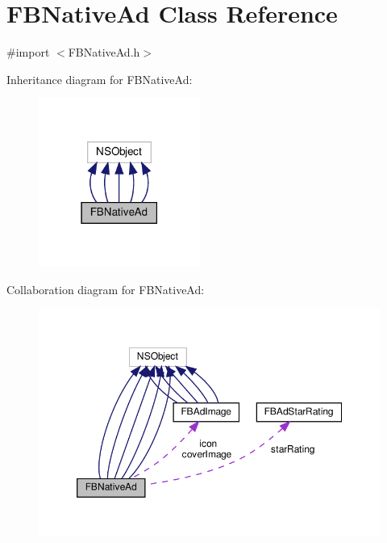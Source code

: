 \hypertarget{interfaceFBNativeAd}{}\section{F\+B\+Native\+Ad Class Reference}
\label{interfaceFBNativeAd}


{\ttfamily \#import $<$F\+B\+Native\+Ad.\+h$>$}



Inheritance diagram for F\+B\+Native\+Ad\+:
\nopagebreak
\begin{figure}[H]
\begin{center}
\leavevmode
\includegraphics[width=150pt]{interfaceFBNativeAd__inherit__graph}
\end{center}
\end{figure}


Collaboration diagram for F\+B\+Native\+Ad\+:
\nopagebreak
\begin{figure}[H]
\begin{center}
\leavevmode
\includegraphics[width=350pt]{interfaceFBNativeAd__coll__graph}
\end{center}
\end{figure}
